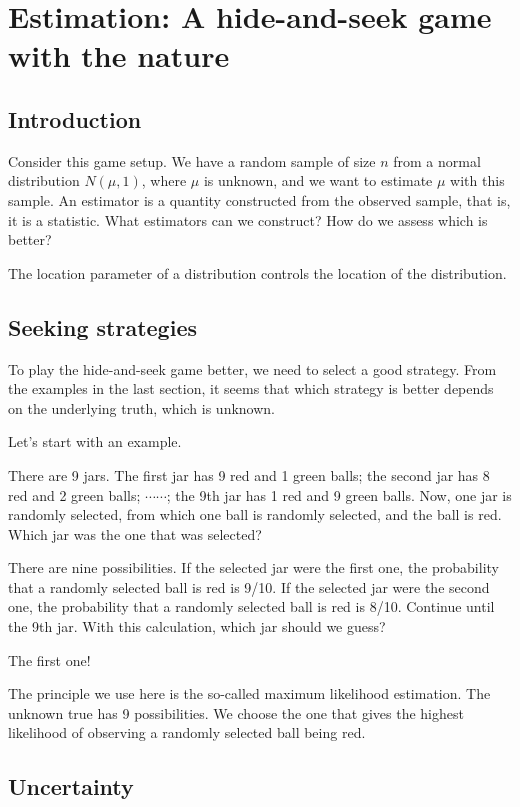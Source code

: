 \hypertarget{ch:estimation}{%
\chapter{Estimation: A hide-and-seek game with the nature}\label{ch:estimation}}


\section{Introduction}
Consider this game setup. We have a random sample of size \(n\) from a normal
distribution \(N(\mu, 1)\), where \(\mu\) is unknown, and we want to estimate \(\mu\)
with this sample. An estimator is a quantity constructed from the observed
sample, that is, it is a statistic. What estimators can we construct? How do we
assess which is better?



The location parameter of a distribution controls the location of the
distribution.


\section{Seeking strategies}

To play the hide-and-seek game better, we need to select a good strategy. From
the examples in the last section, it seems that which strategy is better depends
on the underlying truth, which is unknown.


Let's start with an example.
\begin{illustration}
\label{example:has-jars}
There are 9 jars. The first jar has 9 red and 1 green balls; the second jar has
8 red and 2 green balls; $\cdots\cdots$; the 9th jar has 1 red and 9 green
balls. Now, one jar is randomly selected, from which one ball is randomly
selected, and the ball is red. Which jar was the one that was selected?

There are nine possibilities. If the selected jar were the first one, the
probability that a randomly selected ball is red is 9/10. If the selected jar
were the second one, the probability that a randomly selected ball is red is
8/10. Continue until the 9th jar. With this calculation, which jar should we
guess?

The first one!
\end{illustration}

The principle we use here is the so-called maximum likelihood estimation. The
unknown true has 9 possibilities. We choose the one that gives the highest
likelihood of observing a randomly selected ball being red.

\section{Uncertainty}





